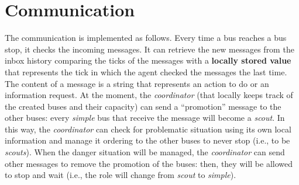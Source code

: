 \documentclass[a4paper]{article}
\begin{document}
\section{Communication}

The communication is implemented as follows. Every time a bus reaches a bus stop, it checks the incoming messages. It can retrieve the new messages from the inbox history comparing the ticks of the messages with a \textbf{locally stored value} that represents the tick in which the agent checked the messages the last time. The content of a message is a string that represents an action to do or an information request. At the moment, the \textit{coordinator} (that locally keeps track of the created buses and their capacity) can send a ``promotion'' message to the other buses: every \textit{simple} bus that receive the message will become a \textit{scout}. In this way, the \textit{coordinator} can check for problematic situation using its own local information and manage it ordering to the other buses to never stop (i.e., to be \textit{scouts}). When the danger situation will be managed, the \textit{coordinator} can send other messages to remove the promotion of the buses: then, they will be allowed to stop and wait (i.e., the role will change from \textit{scout} to \textit{simple}).
\end{document}
